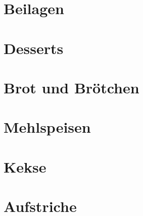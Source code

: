 \documentclass[ngerman,12pt,parskip=half]{scrbook}
\begin{document}
\clearpage

\chapter{Beilagen}

\clearpage

\chapter{Desserts}


\clearpage

\chapter{Brot und Brötchen}

\clearpage

\chapter{Mehlspeisen}

\clearpage

\chapter{Kekse}

\clearpage

\chapter{Aufstriche}
\end{document}
